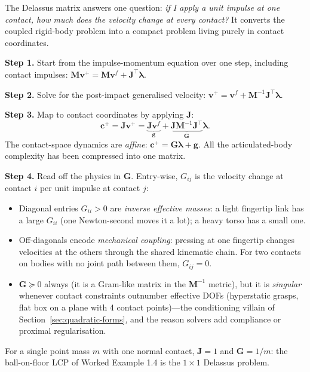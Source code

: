 \documentclass[11pt,twoside]{report}
\theoremstyle{definition}
\theoremstyle{plain}
\theoremstyle{remark}
\newcommand{\0}{\bm{0}}
\newcommand{\M}{\bm{M}}
\newcommand{\J}{\bm{J}}
\begin{document}
\begin{stepbox}
The Delassus matrix answers one question: \emph{if I apply a unit
impulse at one contact, how much does the velocity change at every
contact?} It converts the coupled rigid-body problem into a compact
problem living purely in contact coordinates.

\textbf{Step 1.} Start from the impulse-momentum equation over one step,
including contact impulses:
$\M\bm{v}^{+}=\M\bm{v}^{f}+\J^{\!\top}\bm{\lambda}$.

\textbf{Step 2.} Solve for the post-impact generalised velocity:
$\bm{v}^{+}=\bm{v}^{f}+\M^{-1}\J^{\!\top}\bm{\lambda}$.

\textbf{Step 3.} Map to contact coordinates by applying $\J$:
\begin{equation*}
\bm{c}^{+}=\J\bm{v}^{+}
=\underbrace{\J\bm{v}^{f}}_{\bm{g}}
+\underbrace{\J\M^{-1}\J^{\!\top}}_{\bm{G}}\bm{\lambda}.
\end{equation*}
The contact-space dynamics are \emph{affine}:
$\bm{c}^{+}=\bm{G}\bm{\lambda}+\bm{g}$. All the articulated-body
complexity has been compressed into one matrix.

\textbf{Step 4.} Read off the physics in $\bm{G}$.
Entry-wise, $G_{ij}$ is the velocity change at contact $i$ per unit
impulse at contact $j$:
\begin{itemize}
\item Diagonal entries $G_{ii}>0$ are \emph{inverse effective masses}:
      a light fingertip link has a large $G_{ii}$ (one Newton-second
      moves it a lot); a heavy torso has a small one.
\item Off-diagonals encode \emph{mechanical coupling}: pressing at one
      fingertip changes velocities at the others through the shared
      kinematic chain. For two contacts on bodies with no joint path
      between them, $G_{ij}=0$.
\item $\bm{G}\succeq 0$ always (it is a Gram-like matrix in the
      $\M^{-1}$ metric), but it is \emph{singular} whenever contact
      constraints outnumber effective DOFs (hyperstatic grasps, flat
      box on a plane with 4 contact points)---the conditioning villain
      of Section~\ref{sec:quadratic-forms}, and the reason solvers add
      compliance or proximal regularisation.
\end{itemize}
For a single point mass $m$ with one normal contact, $\J=1$ and
$\bm{G}=1/m$: the ball-on-floor LCP of Worked Example 1.4 is the
$1\times 1$ Delassus problem.
\end{stepbox}
\end{document}
